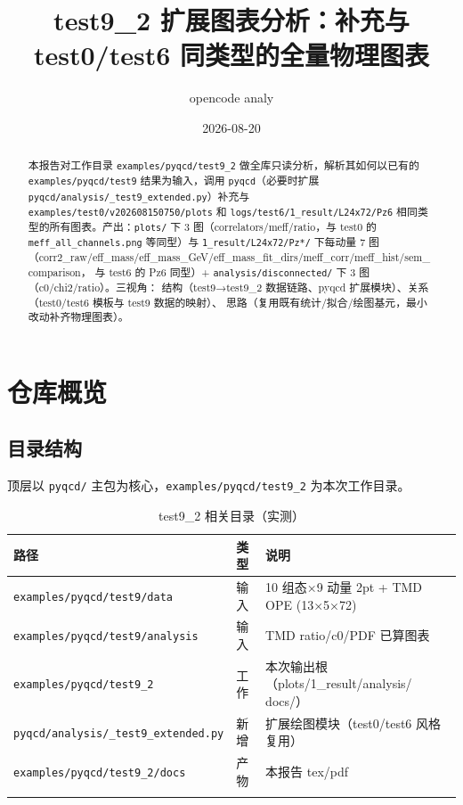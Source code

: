\documentclass[UTF8]{ctexart}
\title{test9\_2 扩展图表分析：补充与 test0/test6 同类型的全量物理图表}
\author{opencode analy}
\date{2026-08-20}
\begin{document}
\maketitle
\sloppy

\begin{abstract}
本报告对工作目录 \texttt{examples/pyqcd/test9\_2} 做全库只读分析，解析其如何以已有的
\texttt{examples/pyqcd/test9} 结果为输入，调用 \texttt{pyqcd}（必要时扩展
\texttt{pyqcd/analysis/\_test9\_extended.py}）补充与
\texttt{examples/test0/v202608150750/plots} 和 \texttt{\nolinkurl{logs/test6/1\_result/L24x72/Pz6}}
相同类型的所有图表。产出：\texttt{plots/} 下 3 图（correlators/meff/ratio，与 test0 的
\texttt{\nolinkurl{meff\_all\_channels.png}} 等同型）与 \texttt{\nolinkurl{1\_result/L24x72/Pz*/}} 下每动量 7 图
（corr2\_raw/eff\_mass/eff\_mass\_GeV/eff\_mass\_fit\_dirs/meff\_corr/meff\_hist/sem\_comparison，
与 test6 的 Pz6 同型）+ \texttt{analysis/disconnected/} 下 3 图（c0/chi2/ratio）。三视角：
结构（test9→test9\_2 数据链路、pyqcd 扩展模块）、关系（test0/test6 模板与 test9 数据的映射）、
思路（复用既有统计/拟合/绘图基元，最小改动补齐物理图表）。
\end{abstract}

\tableofcontents

\section{仓库概览}
\subsection{目录结构}
顶层以 \texttt{pyqcd/} 主包为核心，\texttt{examples/pyqcd/test9\_2} 为本次工作目录。
\begin{xltabular}{\textwidth}{llX}
\toprule
\textcolor{struct}{路径} & 类型 & 说明 \\
\midrule
\endhead
\texttt{examples/pyqcd/test9/data} & 输入 & 10 组态×9 动量 2pt + TMD OPE (13×5×72) \\
\texttt{examples/pyqcd/test9/analysis} & 输入 & TMD ratio/c0/PDF 已算图表 \\
\texttt{examples/pyqcd/test9\_2} & 工作 & 本次输出根（plots/1\_result/analysis/ docs/） \\
\texttt{pyqcd/analysis/\_test9\_extended.py} & 新增 & 扩展绘图模块（test0/test6 风格复用） \\
\texttt{examples/pyqcd/test9\_2/docs} & 产物 & 本报告 tex/pdf \\
\bottomrule
\caption{test9\_2 相关目录（实测）}
\end{xltabular}
\end{document}
